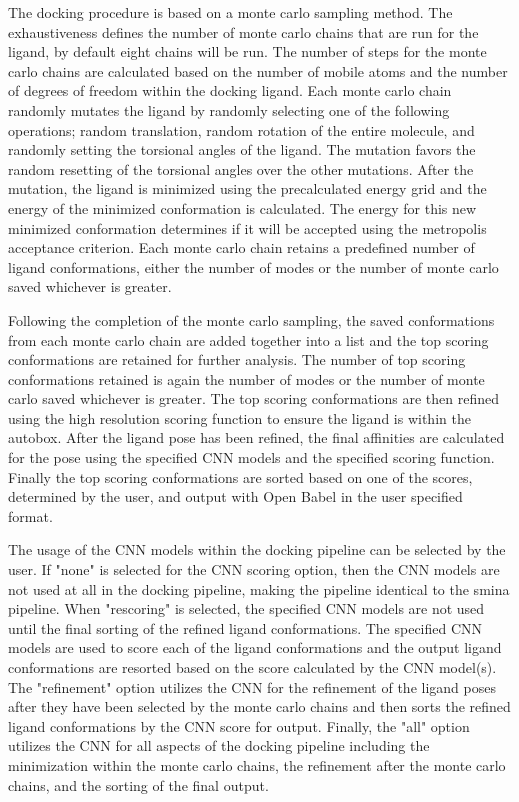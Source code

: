 \documentclass[journal=jcisd8,manuscript=article]{achemso}
\begin{document}
The docking procedure is based on a monte carlo sampling method. The exhaustiveness defines the number of monte carlo chains that are run for the ligand, by default eight chains will be run. The number of steps for the monte carlo chains are calculated based on the number of mobile atoms and the number of degrees of freedom within the docking ligand. Each monte carlo chain randomly mutates the ligand by randomly selecting one of the following operations; random translation, random rotation of the entire molecule, and randomly setting the torsional angles of the ligand. The mutation favors the random resetting of the torsional angles over the other mutations. After the mutation, the ligand is minimized using the precalculated energy grid and the energy of the minimized conformation is calculated. The energy for this new minimized conformation determines if it will be accepted using the metropolis acceptance criterion. Each monte carlo chain retains a predefined number of ligand conformations, either the number of modes or the number of monte carlo saved whichever is greater.

Following the completion of the monte carlo sampling, the saved conformations from each monte carlo chain are added together into a list and the top scoring conformations are retained for further analysis. The number of top scoring conformations retained is again the number of modes or the number of monte carlo saved whichever is greater. The top scoring conformations are then refined using the high resolution scoring function to ensure the ligand is within the autobox. After the ligand pose has been refined, the final affinities are calculated for the pose using the specified CNN models and the specified scoring function. Finally the top scoring conformations are sorted based on one of the scores, determined by the user, and output with Open Babel in the user specified format.

The usage of the CNN models within the docking pipeline can be selected by the user. If "none" is selected for the CNN scoring option, then the CNN models are not used at all in the docking pipeline, making the pipeline identical to the smina pipeline. When "rescoring" is selected, the specified CNN models are not used until the final sorting of the refined ligand conformations. The specified CNN models are used to score each of the ligand conformations and the output ligand conformations are resorted based on the score calculated by the CNN model(s). The "refinement" option utilizes the CNN for the refinement of the ligand poses after they have been selected by the monte carlo chains and then sorts the refined ligand conformations by the CNN score for output. Finally, the "all" option utilizes the CNN for all aspects of the docking pipeline including the minimization within the monte carlo chains, the refinement after the monte carlo chains, and the sorting of the final output. 
\end{document}
